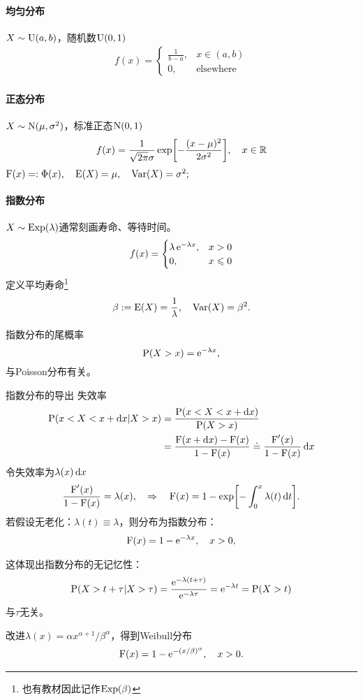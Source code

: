 \paragraph{均匀分布}$X\sim\operatorname{U}(a,b)$，随机数$\operatorname{U}(0,1)$
\begin{align}
	f(x)=\begin{cases}
		\frac1{b-a},&x\in(a,b)\\
		0,&\text{elsewhere}
	\end{cases}
\end{align}
\paragraph{正态分布}$X\sim\operatorname{N}(\mu,\sigma^2)$，标准正态$\operatorname{N}(0,1)$
\begin{align}
	f(x)=\frac1{\sqrt{2\pi}\sigma}\exp\biggl[-\frac{(x-\mu)^2}{2\sigma^2}\biggr],\quad x\in\mathbb R
\end{align}
$\operatorname{F}(x)=:\Phi(x),\quad\operatorname{E}(X)=\mu,\quad\operatorname{Var}(X)=\sigma^2;$
\paragraph{指数分布}$X\sim\operatorname{Exp}(\lambda)$通常刻画寿命、等待时间。
\begin{align}
	f(x)=\begin{cases}
		\lambda\mathop{}\!\mathrm{e}^{-\lambda x},&x>0\\
		0,&x\leqslant 0
	\end{cases}
\end{align}
定义平均寿命\footnote{也有教材因此记作$\operatorname{Exp}(\beta)$}
\[
	\beta:=\operatorname{E}(X)=\frac1\lambda,\quad\operatorname{Var}(X)=\beta^2.
\]

指数分布的尾概率
\[
	\P(X>x)=\e{-\lambda x},%
\]
与Poisson分布有关。
\begin{example}{指数分布的导出}{}
	失效率
	\begin{align*}
		\operatorname{P}(x<X<x+\mathop{}\!\mathrm{d} x|X>x)&=\frac{\operatorname{P}(x<X<x+\mathop{}\!\mathrm{d} x)}{\operatorname{P}(X>x)}\\
		&=\frac{\operatorname{F}(x+\mathop{}\!\mathrm{d} x)-\operatorname{F}(x)}{1-\operatorname{F}(x)}\doteq\frac{\operatorname{F}'(x)}{1-\operatorname{F}(x)}\mathop{}\!\mathrm{d} x
	\end{align*}
	令失效率为$\lambda(x)\mathop{}\!\mathrm{d} x$
	\[
		\frac{\operatorname{F}'(x)}{1-\operatorname{F}(x)}=\lambda(x),\quad\Rightarrow\quad\operatorname{F}(x)=1-\exp\biggl[-\int_0^x\lambda(t)\mathop{}\!\mathrm{d} t\biggr].
	\]
	若假设无老化：$\lambda(t)\equiv\lambda$，则分布为指数分布：
	\begin{align}
		\operatorname{F}(x)=1-\mathop{}\!\mathrm{e}^{-\lambda x},\quad x>0,
	\end{align}

	这体现出指数分布的无记忆性：
	\[
		\operatorname{P}(X>t+\tau|X>\tau)=\frac{\mathop{}\!\mathrm{e}^{-\lambda(t+\tau)}}{\mathop{}\!\mathrm{e}^{-\lambda\tau}}=\mathop{}\!\mathrm{e}^{-\lambda t}=\operatorname{P}(X>t)
	\]
	与$\tau$无关。

	改进$\lambda(x)=\alpha x^{\alpha+1}/\beta^\alpha$，得到Weibull分布
	\begin{align*}
		\operatorname{F}(x)=1-\mathop{}\!\mathrm{e}^{-(x/\beta)^\alpha},\quad x>0.
	\end{align*}
\end{example}
